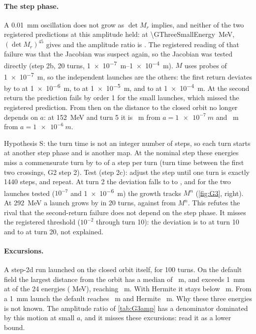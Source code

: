 \paragraph{The step phase.}
A \SI{0.01}{mm} oscillation does not grow as $\det M_r$ implies, and neither of the two registered predictions at this amplitude held: at \SI{\GThreeSmallEnergy}{MeV}, $(\det M_r)^{45}$ gives \GThreeSmallPred{} and the amplitude ratio is \GThreeSmallArThere.
The registered reading of that failure was that the Jacobian was suspect again, so the Jacobian was tested directly (step 2b, 20 turns, \SIrange{1e-7}{1e-4}{m}).
$M$ uses probes of \SI{1e-7}{m}, so the independent launches are the others: the first return deviates by \GThreeFirstMicMin{} to \GThreeFirstMicMax{} at \SI{1e-6}{m}, \GThreeFirstTenMin{} to \GThreeFirstTenMax{} at \SI{1e-5}{m}, and \GThreeFirstHunMin{} to \GThreeFirstHunMax{} at \SI{1e-4}{m}.
At the second return the prediction fails by order 1 for the small launches, which missed the registered prediction.
From then on the distance to the closed orbit no longer depends on $a$: at \SI{152}{MeV} and turn 5 it is \GThreeJitterA{}~m from $a=\SI{1e-7}{m}$ and \GThreeJitterB{}~m from $a=\SI{1e-6}{m}$.

Hypothesis S: the turn time is not an integer number of steps, so each turn starts at another step phase and is another map.
At the nominal step these energies miss a commensurate turn by \GThreeSlipMin{} to \GThreeSlipMax{} of a step per turn (turn time between the first two crossings, G2 step 2).
Test (step 2c): adjust the step until one turn is exactly 1440 steps, and repeat.
At turn 2 the deviation falls to \GThreeComTwoMin{} to \GThreeComTwoMax, and for the two launches tested ($10^{-7}$ and \SI{1e-6}{m}) the growth tracks $M^n$ (\cref{fig:G3}, right).
At \SI{292}{MeV} a launch grows by \GThreeComGrow{} in 20 turns, against \GThreeComGrowPred{} from $M^n$.
This refutes the rival that the second-return failure does not depend on the step phase.
It misses the registered threshold ($10^{-2}$ through turn 10): the deviation is \GThreeComTenMin{} to \GThreeComTenMax{} at turn 10 and \GThreeComTwentyMin{} to \GThreeComTwentyMax{} at turn 20, not explained.

\paragraph{Excursions.}
A step-2d run launched on the closed orbit itself, for 100 turns.
On the default field the largest distance from the orbit has a median of \GThreePeakMed{}~m, and exceeds \SI{1}{mm} at \GThreePeakN{} of the 24 energies (\GThreePeakEnergies{} MeV), reaching \GThreePeakMax{}~m.
With Hermite it stays below \GThreeHermPeakMax{}~m.
From a \SI{1}{mm} launch the default reaches \GThreeOneMmPeak{}~m and Hermite \GThreeOneMmPeakHerm{}~m.
Why these three energies is not known.
The amplitude ratio of \cref{tab:G3amp} has a denominator dominated by this motion at small $a$, and it misses these excursions: read it as a lower bound.

